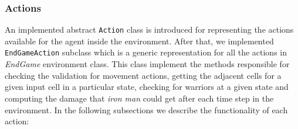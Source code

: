 \documentclass{article}
\newcommand{\code}[1]{\colorbox{codegray}{\texttt{#1}}}
\begin{document}
\subsubsection{Actions}
An implemented abstract \code{Action} class is introduced for representing the actions available for the agent inside the environment. After that, we implemented \code{EndGameAction} subclass which is a generic representation for all the actions in \textit{EndGame} environment class. This class implement the methods responsible for checking the validation for movement actions, getting the adjacent cells for a given input cell in a particular state, checking for warriors at a given state and computing the damage that \textit{iron man} could get after each time step in the environment. In the following subsections we describe the functionality of each action:
\end{document}
